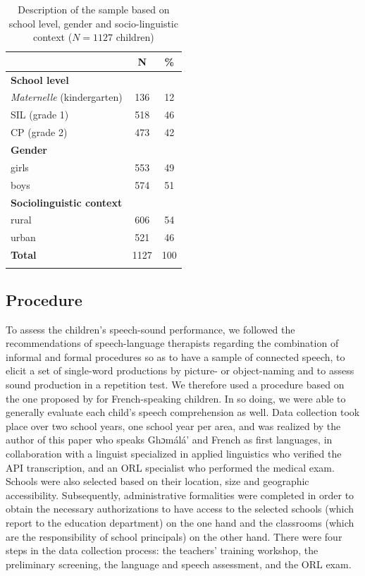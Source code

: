 \documentclass[output=paper,newtxmath,modfonts,nonflat,draftmode]{langsci/langscibook}
\begin{document}
\begin{table}
\caption{Description of the sample based on school level, gender and socio-linguistic context ($N=1127$ children) }
\begin{tabularx}{.8\textwidth}{lSS}
\lsptoprule
	& {N} & {\%} \\
\midrule
\textbf{School level}\\
\midrule
\textit{Maternelle} (kindergarten) & {136}  & 12\\
{SIL} (grade 1) & {518}  & 46 \\
{CP} (grade 2) & {473}  & 42 \\

\tablevspace
\textbf{Gender}  &  & \\
\midrule
{girls} & {553}  & 49 \\
{boys} & {574}  & 51 \\

\tablevspace
{\textbf{Sociolinguistic context}}   & \\
\midrule
{rural} & {606}  & 54 \\
{urban} & {521}  & 46\\
\midrule
\textbf{{Total} } & {1127}  & {100} \\
\lspbottomrule
\end{tabularx}
\label{tab:takam:sample_description}
\end{table}

\subsection{Procedure}

To assess the children’s speech-sound performance, we followed the recommendations of speech-language therapists regarding the combination of informal and formal procedures so as to have a sample of connected speech, to elicit a set of single-word productions by picture- or object-naming and to assess sound production in a repetition test. We therefore used a procedure based on the one proposed by \citet{MaurinCherou1993} for French-speaking children. In so doing, we were able to generally evaluate each child’s speech comprehension as well. Data collection took place over two school years, one school year per area, and was realized by the author of this paper who speaks Ghɔmálá’ and French as first languages, in collaboration with a linguist specialized in applied linguistics who verified the API transcription, and an ORL specialist who performed the medical exam. Schools were also selected based on their location, size and geographic accessibility. Subsequently, administrative formalities were completed in order to obtain the necessary authorizations to have access to the selected schools (which report to the education department) on the one hand and the classrooms (which are the responsibility of school principals) on the other hand. There were four steps in the data collection process: the teachers’ training workshop, the preliminary screening, the language and speech assessment, and the ORL exam.
\end{document}
